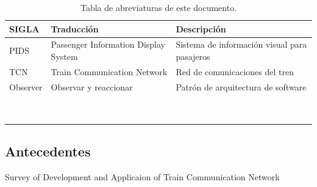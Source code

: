 \documentclass[
11pt, %
]{charter}
\begin{document}
\begin{table}[h!]
\begin{tabular}{|l|l|l|}
\hline
SIGLA & Traducción                           & Descripción                                  \\ \hline
PIDS  & Passenger Information Display System & Sistema de información visual para pasajeros \\ \hline
TCN   & Train Communication Network          & Red de comunicaciones del tren               \\ \hline
 Observer     & Observar y reaccionar                                     & Patrón de arquitectura de software                          \\ \hline
      &                                      &                                              \\ \hline
      &                                      &                                              \\ \hline
      &                                      &                                              \\ \hline
      &                                      &                                              \\ \hline
      &                                      &                                              \\ \hline
      &                                      &                                              \\ \hline
      &                                      &                                              \\ \hline
      &                                      &                                              \\ \hline
      &                                      &                                              \\ \hline
\end{tabular}
\caption{Tabla de abreviaturas de este documento.}
\label{table:abreviaturas}
\end{table}


\pagebreak

\subsection{Antecedentes}

Survey of Development and Applicaion of Train Communication Network
\end{document}
